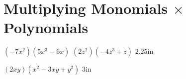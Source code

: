 \section{Multiplying Monomials $\times$ Polynomials}


\myProblems
    {
        $ (-7x^2)  (5x^3 - 6x) $
    }
    {
        $ (2z^2)  (-4z^3 + z) $
    }
    {2.25in}


\myWideProblem
    {
        $ (2xy)  (x^2 -3xy + y^2) $
    }
    {3in}
